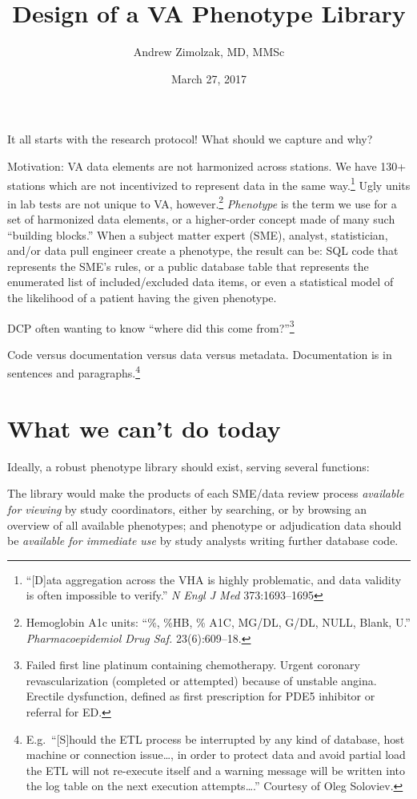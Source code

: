 \documentclass{tufte-handout}
\title{Design of a VA Phenotype Library}
\author{Andrew Zimolzak, MD, MMSc}
\date{March 27, 2017}
\begin{document}
\maketitle

It all starts with the research protocol! What should we capture and
why? 

Motivation: VA data elements are not harmonized across stations. We
have 130+ stations which are not incentivized to represent data in the
same way.\footnote{``[D]ata aggregation across the VHA is highly
  problematic, and data validity is often impossible to verify.''
  \emph{N Engl J Med} 373:1693--1695} Ugly units in lab tests are not
unique to VA, however.\footnote{Hemoglobin A1c units: ``\%, \%HB, \%
  A1C, MG/DL, G/DL, NULL, Blank, U.'' \emph{Pharmacoepidemiol Drug
    Saf.} 23(6):609--18.} \emph{Phenotype} is the term we use for a
set of harmonized data elements, or a higher-order concept made of
many such ``building blocks.'' When a subject matter expert (SME),
analyst, statistician, and/or data pull engineer create a phenotype,
the result can be: SQL code that represents the SME's rules, or a
public database table that represents the enumerated list of
included/excluded data items, or even a statistical model of the
likelihood of a patient having the given phenotype.


DCP often wanting to know ``where did this come
from?''\footnote{Failed first line platinum containing chemotherapy.
  Urgent coronary revascularization (completed or attempted) because
  of unstable angina. Erectile dysfunction, defined as first
  prescription for PDE5 inhibitor or referral for ED.}


Code versus documentation versus data versus metadata. Documentation
is in sentences and paragraphs.\footnote{E.g.\ ``[S]hould the ETL
  process be interrupted by any kind of database, host machine or
  connection issue\ldots{}, in order to protect data and avoid partial
  load the ETL will not re-execute itself and a warning message will
  be written into the log table on the next execution
  attempts\ldots{}.'' Courtesy of Oleg Soloviev.}


\section{What we can't do today}



Ideally, a robust phenotype library should exist, serving several
functions: 

The library would make the products of each SME/data review process
\emph{available for viewing} by study coordinators, either by
searching, or by browsing an overview of all available phenotypes; and
phenotype or adjudication data should be \emph{available for immediate
  use} by study analysts writing further database code.
\end{document}
